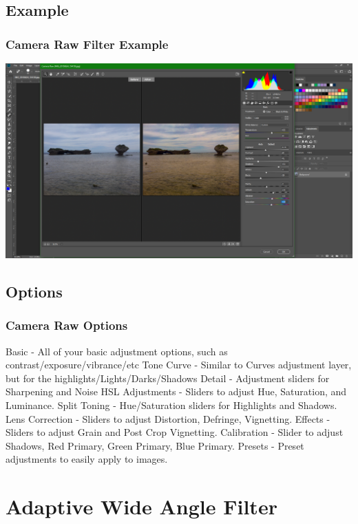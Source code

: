 \documentclass{beamer}
\begin{document}
\subsection{Example}		
\begin{frame}
	\frametitle{Camera Raw Filter Example}
	\begin{center}
	\includegraphics[width=1.10\textwidth]{images/Camera raw filter example.png}
	\end{center}
\end{frame}

\subsection{Options}		
\begin{frame}
	\frametitle{Camera Raw Options}
	\begin{outline}
		\1 Basic - All of your basic adjustment options, such as contrast/exposure/vibrance/etc
		\1 Tone Curve - Similar to Curves adjustment layer, but for the highlights/Lights/Darks/Shadows
		\1 Detail - Adjustment sliders for Sharpening and Noise
		\1 HSL Adjustments - Sliders to adjust Hue, Saturation, and Luminance.
		\1 Split Toning - Hue/Saturation sliders for Highlights and Shadows.
		\1 Lens Correction - Sliders to adjust Distortion, Defringe, Vignetting.
		\1 Effects - Sliders to adjust Grain and Post Crop Vignetting.
		\1 Calibration - Slider to adjust Shadows, Red Primary, Green Primary, Blue Primary.
		\1 Presets - Preset adjustments to easily apply to images.
	\end{outline}
\end{frame}

		\section{Adaptive Wide Angle Filter}
\end{document}
